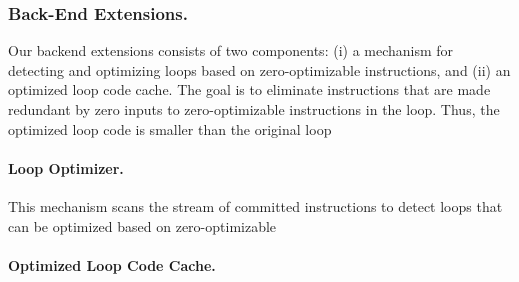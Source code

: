  
 \subsubsection{Back-End Extensions.}
 Our backend extensions consists of two components: (i) a mechanism for detecting and optimizing loops based on zero-optimizable instructions, and (ii) an optimized loop code cache.  The goal is to eliminate instructions that are made redundant by zero inputs to zero-optimizable instructions in the loop.  Thus, the optimized loop code is smaller than the original loop 
 
 \paragraph{Loop Optimizer.} This mechanism scans the stream of committed instructions to detect loops that can be optimized based on zero-optimizable 
 
 \paragraph{Optimized Loop Code Cache.}
 
 
